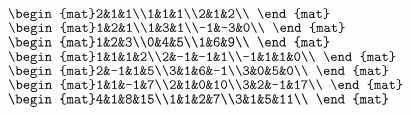\begin{Exercise}[
name={},
title={}, 
difficulty=0,
origin={\cite{GH}}]
\begin{multicols}{2}
\Question $\begin{mat}2&1&1\\1&1&1\\2&1&2\\ \end{mat}$
\Question $\begin{mat}1&2&1\\1&3&1\\-1&-3&0\\ \end{mat}$
\Question $\begin{mat}1&2&3\\0&4&5\\1&6&9\\ \end{mat}$
\Question $\begin{mat}1&1&1&2\\2&-1&-1&1\\-1&1&1&0\\ \end{mat}$
\Question $\begin{mat}2&-1&1&5\\3&1&6&-1\\3&0&5&0\\ \end{mat}$
\Question $\begin{mat}1&1&-1&7\\2&1&0&10\\3&2&-1&17\\ \end{mat}$
\Question $\begin{mat}4&1&8&15\\1&1&2&7\\3&1&5&11\\ \end{mat}$
\EndCurrentQuestion
\end{multicols}
\end{Exercise}

